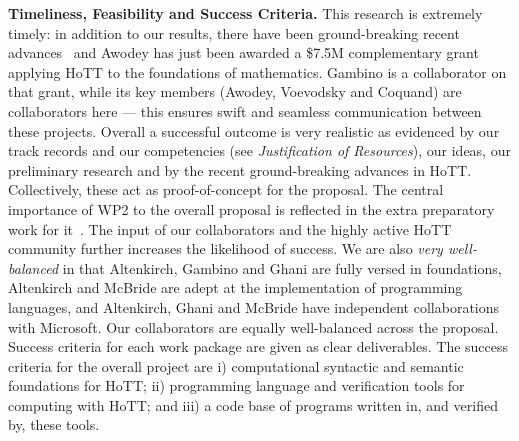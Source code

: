 \documentclass[a4paper,11pt]{article}
\begin{document}
{\bf Timeliness, Feasibility and Success Criteria.}  This research is
extremely timely: in addition to our results, there have been
ground-breaking recent advances~\cite{ShulmanM:uniidh,BezemM:cubsmt,
  nominal} and Awodey has just been awarded a \$7.5M complementary
grant applying HoTT to the foundations of mathematics. Gambino is a
collaborator on that grant, while its key members (Awodey, Voevodsky
and Coquand) are collaborators here --- this ensures swift and
seamless communication between these projects.  Overall a successful
outcome is very realistic as evidenced by our track records and our
competencies (see {\em Justification of Resources}), our ideas, our
preliminary research and by the
recent ground-breaking advances in HoTT. Collectively, these act as
proof-of-concept for the proposal. The central importance of WP2 to
the overall proposal is reflected in the extra preparatory work for
it~\cite{alti-ctt,txa-ihp14}.  The input of our collaborators and the
highly active HoTT community further increases the likelihood of
success. We are also {\em very well-balanced} in that Altenkirch,
Gambino and Ghani are fully versed in foundations, Altenkirch and
McBride are adept at the implementation of programming languages, and
Altenkirch, Ghani and McBride have independent collaborations with
Microsoft. Our collaborators are equally well-balanced across the
proposal. Success criteria for each work package are given as clear
deliverables. The success criteria for the overall project are i)
computational syntactic and semantic foundations for HoTT; ii)
programming language and verification tools for computing with HoTT;
and iii) a code base of programs written in, and verified by, these
tools.
\end{document}
